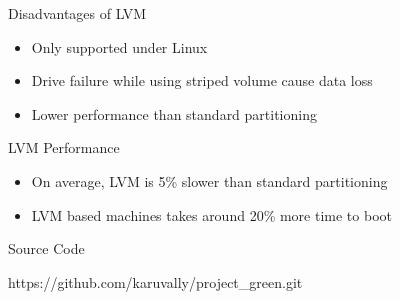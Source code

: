 \documentclass{beamer}
\begin{document}
\begin{frame}{Disadvantages of LVM}
    \begin{itemize}
        \item<2-> Only supported under Linux
        \item<3-> Drive failure while using striped volume cause data loss
        \item<5-> Lower performance than standard partitioning
    \end{itemize}
\end{frame}

\begin{frame}{LVM Performance}
    \begin{itemize}
        \item<2-> On average, LVM is 5\% slower than standard partitioning
        \item<3-> LVM based machines takes around 20\% more time to boot 
    \end{itemize}
\end{frame}

\begin{frame}{Source Code} 
    \begin{center}
        \large https://github.com/karuvally/project\_green.git
    \end{center}
\end{frame}
\end{document}
